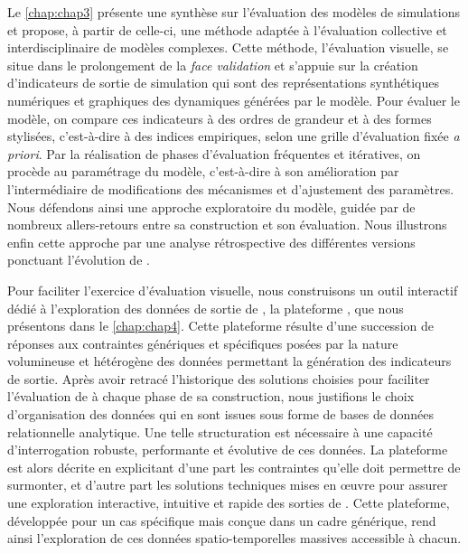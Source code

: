 Le \cref{chap:chap3} présente une synthèse sur l'évaluation des modèles de simulations et propose, à partir de celle-ci, une méthode adaptée à l'évaluation collective et interdisciplinaire de modèles complexes.
Cette méthode, l'\og évaluation visuelle\fg{}, se situe dans le prolongement de la \textit{face validation} et s'appuie sur la création d'\og{}indicateurs de sortie de simulation\fg{} qui sont des représentations synthétiques numériques et graphiques des dynamiques générées par le modèle.
Pour évaluer le modèle, on compare ces indicateurs à des \og ordres de grandeur\fg{} et à des \og formes stylisées\fg{}, c'est-à-dire à des \og indices empiriques\fg{}, selon une grille d'évaluation fixée \textit{a priori}.
Par la réalisation de phases d'évaluation fréquentes et itératives, on procède au \og paramétrage\fg{} du modèle, c'est-à-dire à son amélioration par l'intermédiaire de modifications des mécanismes et d'ajustement des paramètres.
Nous défendons ainsi une approche exploratoire du modèle, guidée par de nombreux allers-retours entre sa construction et son évaluation.
Nous illustrons enfin cette approche par une analyse rétrospective des différentes versions ponctuant l'évolution de \simfeodal{}.

Pour faciliter l'exercice d'évaluation visuelle, nous construisons un outil interactif dédié à l'exploration des données de sortie de \simfeodal{}, la plateforme \simedb{}, que nous présentons dans le \cref{chap:chap4}.
Cette plateforme résulte d'une succession de réponses aux contraintes génériques et spécifiques posées par la nature volumineuse et hétérogène des données permettant la génération des indicateurs de sortie.
Après avoir retracé l'historique des solutions choisies pour faciliter l'évaluation de \simfeodal{} à chaque phase de sa construction, nous justifions le choix d'organisation des données qui en sont issues sous forme de bases de données relationnelle analytique.
Une telle structuration est nécessaire à une capacité d'interrogation robuste, performante et évolutive de ces données.
La plateforme \simedb{} est alors décrite en explicitant d'une part les contraintes qu'elle doit permettre de surmonter, et d'autre part les solutions techniques mises en œuvre pour assurer une exploration interactive, intuitive et rapide des sorties de \simfeodal{}.
Cette plateforme, développée pour un cas spécifique mais conçue dans un cadre générique, rend ainsi l'exploration de ces données spatio-temporelles massives accessible à chacun.


